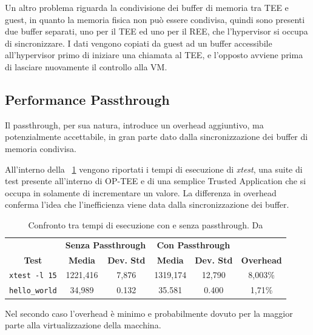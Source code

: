 \documentclass[12pt,italian]{report}
\begin{document}
	Un altro problema riguarda la condivisione dei buffer di memoria tra TEE e guest, in quanto la memoria fisica non può essere condivisa, quindi sono presenti due buffer separati, uno per il TEE ed uno per il REE, che l'hypervisor si occupa di sincronizzare. I dati vengono copiati da guest ad un buffer accessibile all'hypervisor primo di iniziare una chiamata al TEE, e l'opposto avviene prima di lasciare nuovamente il controllo alla VM. 
	
	\subsection{Performance Passthrough}
	\label{subsec:perf-pass}
	Il passthrough, per sua natura, introduce un overhead aggiuntivo, ma potenzialmente accettabile, in gran parte dato dalla sincronizzazione dei buffer di memoria condivisa. 
	
	All'interno della \tablename~\ref{tab:performance_pass} vengono riportati i tempi di esecuzione di \textit{xtest}, una suite di test presente all'interno di OP-TEE e di una semplice Trusted Application che si occupa in solamente di incrementare un valore. La differenza in overhead conferma l'idea che l'inefficienza viene data dalla sincronizzazione dei buffer.
	
	\begin{table}[h]
		\begin{tabular}{cccccc}
			\multicolumn{1}{c|}{}  & \multicolumn{2}{c|}{\textbf{Senza Passthrough}} & \multicolumn{2}{c|}{\textbf{Con Passthrough}} &  \\
			\multicolumn{1}{c|}{\multirow{-2}{*}{\textbf{Test}}} &
			\multicolumn{1}{c|}{\textbf{Media}} &
			\multicolumn{1}{c|}{\textbf{Dev. Std}} &
			\multicolumn{1}{c|}{\textbf{Media}} &
			\multicolumn{1}{c|}{\textbf{Dev. Std}} &
			\multirow{-2}{*}{\textbf{Overhead}} \\ \hline
			\texttt{xtest -l 15}    & 1221,416  & 7,876 & 1319,174 & 12,790 & 8,003\% \\
			\texttt{hello\_world}   & 34,989    & 0.132 & 35.581 & 0.400 & 1,71\% \\
		\end{tabular}
		\caption{
			Confronto tra tempi di esecuzione con e senza passthrough. Da \cite{tesi_cutecchia}
		}
		\label{tab:performance_pass}
	\end{table}
	
	Nel secondo caso l'overhead è minimo e probabilmente dovuto per la maggior parte alla virtualizzazione della macchina.
	
\end{document}
